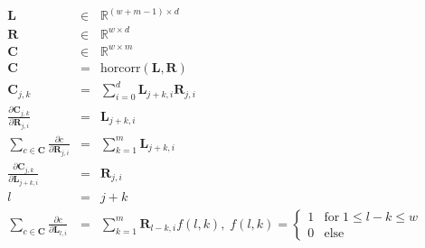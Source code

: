 \documentclass[varwidth=true, border=10pts]{standalone}
\begin{document}
\begin{eqnarray*}
    \mathbf{L} & \in & \mathbb{R}^{(w + m - 1) \times d} \\
    \mathbf{R} & \in & \mathbb{R}^{w \times d} \\
    \mathbf{C} & \in & \mathbb{R}^{w \times m} \\
    \mathbf{C} & = & \text{horcorr}(\mathbf{L}, \mathbf{R}) \\
    \mathbf{C}_{j, k} & = & \sum_{i = 0}^{d} \mathbf{L}_{j + k, i} \mathbf{R}_{j,i} \\
    \frac{\partial \mathbf{C}_{j, k}}{\partial \mathbf{R}_{j,i}} & = & \mathbf{L}_{j + k, i} \\
    \sum_{c \in \mathbf{C}} \frac{\partial c}{\partial \mathbf{R}_{j,i}} & = & \sum_{k = 1}^{m} \mathbf{L}_{j + k, i} \\
    \frac{\partial \mathbf{C}_{j, k}}{\partial \mathbf{L}_{j + k, i}} & = & \mathbf{R}_{j,i} \\
    l & = & j + k \\
    \sum_{c \in \mathbf{C}} \frac{\partial c}{\partial \mathbf{L}_{l, i}} & = & \sum_{k = 1}^{m}
        \mathbf{R}_{l - k,i} f(l, k), \; f(l, k) = \begin{cases} 1 & \text{for} \; 1 \leq l - k \leq w\\
        0 & \text{else}
    \end{cases}
\end{eqnarray*}
\end{document}
